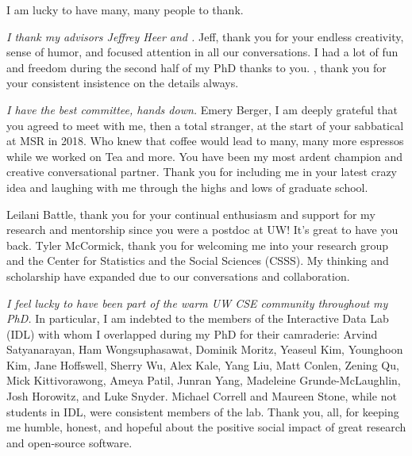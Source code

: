 \small
I am lucky to have many, many people to thank. 

\textit{I thank my advisors Jeffrey Heer and \reneJust.} Jeff, thank you for
your endless creativity, sense of humor, and focused attention in all our
conversations. I had a lot of fun and freedom during the second half of my PhD
thanks to you. \rene, thank you for your consistent insistence on the details
always.

\textit{I have the best committee, hands down.} Emery Berger, I am deeply grateful
that you agreed to meet with me, then a total stranger, at the start of your
sabbatical at MSR in 2018. Who knew that coffee would lead to many, many
more espressos while we worked on Tea and more. You have been my most ardent
champion and creative conversational partner. Thank you for including me in your latest crazy idea and laughing with me
through the highs and lows of graduate school. 


Leilani Battle, thank you for your continual enthusiasm and support for my
research and mentorship since you were a postdoc at UW! It's great to have you back.    
Tyler McCormick, thank you for welcoming me into your research group and the
Center for Statistics and the Social Sciences (CSSS). My thinking and
scholarship have expanded due to our conversations and collaboration. 

\textit{I feel lucky to have been part of the warm UW CSE community throughout
my PhD.} In particular, I am indebted to the members of the Interactive Data Lab
(IDL) with whom I overlapped during my PhD for their camraderie: Arvind
Satyanarayan, Ham Wongsuphasawat, Dominik Moritz, Yeaseul Kim, Younghoon Kim,
Jane Hoffswell, Sherry Wu, Alex Kale, Yang Liu, Matt Conlen, Zening Qu, Mick
Kittivorawong, Ameya Patil, Junran Yang, Madeleine Grunde-McLaughlin, Josh
Horowitz, and Luke Snyder. Michael Correll and Maureen Stone, while not students
in IDL, were consistent members of the lab. Thank you, all, for keeping me
humble, honest, and hopeful about the positive social impact of great research
and open-source software.

